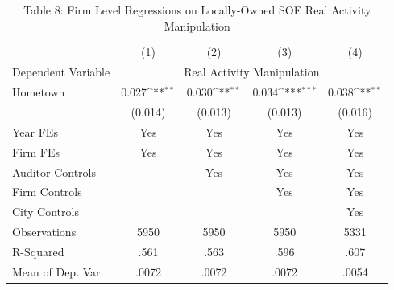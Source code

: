 \begin{table}[p]\centering\captionsetup{width=\textwidth,labelformat=empty}\begin{threeparttable}\footnotesize{
\def\sym#1{\ifmmode^{#1}\else\(^{#1}\)\fi}
\caption{Table 8: Firm Level Regressions on Locally-Owned SOE Real Activity Manipulation}
\begin{tabular}{l*{4}{c}}
\hline\hline
                    &\multicolumn{1}{c}{(1)}         &\multicolumn{1}{c}{(2)}         &\multicolumn{1}{c}{(3)}         &\multicolumn{1}{c}{(4)}         \\
Dependent Variable & \multicolumn{4}{c}{ Real Activity Manipulation }\\
\hline
Hometown            &       0.027\sym{**} &       0.030\sym{**} &       0.034\sym{***}&       0.038\sym{**} \\
                    &     (0.014)         &     (0.013)         &     (0.013)         &     (0.016)         \\
\hline
Year FEs         & Yes & Yes & Yes & Yes \\
Firm FEs         & Yes & Yes & Yes & Yes \\
Auditor Controls &     & Yes & Yes & Yes \\
Firm Controls    &     &     & Yes & Yes \\
City Controls    &     &     &     & Yes \\
\hline
Observations        &        5950         &        5950         &        5950         &        5331         \\
R-Squared           &        .561         &        .563         &        .596         &        .607         \\
Mean of Dep. Var.   &       .0072         &       .0072         &       .0072         &       .0054         \\
\hline\hline
\end{tabular}}
\captionsetup{justification=justified,labelformat=empty}
\begin{tablenotes}

\end{tablenotes}
\end{threeparttable}
\end{table}
